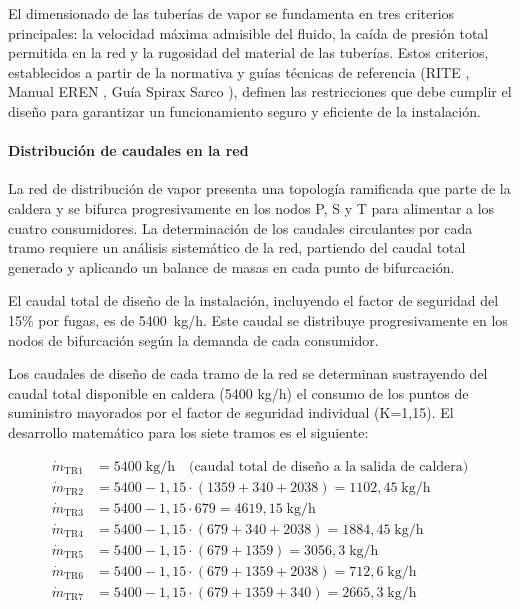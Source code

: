 \documentclass[12pt]{article}
\begin{document}
El dimensionado de las tuberías de vapor se fundamenta en tres criterios principales: la velocidad máxima admisible del fluido, la caída de presión total permitida en la red y la rugosidad del material de las tuberías. Estos criterios, establecidos a partir de la normativa y guías técnicas de referencia (RITE \cite{RITE2007}, Manual EREN \cite{EREN2015}, Guía Spirax Sarco \cite{SpiraxSarco2020}), definen las restricciones que debe cumplir el diseño para garantizar un funcionamiento seguro y eficiente de la instalación.

\paragraph{Distribución de caudales en la red}

La red de distribución de vapor presenta una topología ramificada que parte de la caldera y se bifurca progresivamente en los nodos P, S y T para alimentar a los cuatro consumidores. La determinación de los caudales circulantes por cada tramo requiere un análisis sistemático de la red, partiendo del caudal total generado y aplicando un balance de masas en cada punto de bifurcación.

El caudal total de diseño de la instalación, incluyendo el factor de seguridad del 15\% por fugas, es de 5400~kg/h. Este caudal se distribuye progresivamente en los nodos de bifurcación según la demanda de cada consumidor. 

Los caudales de diseño de cada tramo de la red se determinan sustrayendo del caudal total disponible en caldera (5400 kg/h) el consumo de los puntos de suministro mayorados por el factor de seguridad individual (K=1,15). El desarrollo matemático para los siete tramos es el siguiente:

\begin{align}
	\dot{m}_{\mathrm{TR1}} & = 5400\;\text{kg/h} \quad \text{(caudal total de diseño a la salida de caldera)} \\
	\dot{m}_{\mathrm{TR2}} & = 5400 - 1{,}15 \cdot (1359 + 340 + 2038) = 1102{,}45\;\text{kg/h}               \\
	\dot{m}_{\mathrm{TR3}} & = 5400 - 1{,}15 \cdot 679 = 4619{,}15\;\text{kg/h}                               \\
	\dot{m}_{\mathrm{TR4}} & = 5400 - 1{,}15 \cdot (679 + 340 + 2038) = 1884{,}45\;\text{kg/h}                \\
	\dot{m}_{\mathrm{TR5}} & = 5400 - 1{,}15 \cdot (679 + 1359) = 3056{,}3\;\text{kg/h}                       \\
	\dot{m}_{\mathrm{TR6}} & = 5400 - 1{,}15 \cdot (679 + 1359 + 2038) = 712{,}6\;\text{kg/h}                 \\
	\dot{m}_{\mathrm{TR7}} & = 5400 - 1{,}15 \cdot (679 + 1359 + 340) = 2665{,}3\;\text{kg/h}
\end{align}
\end{document}
